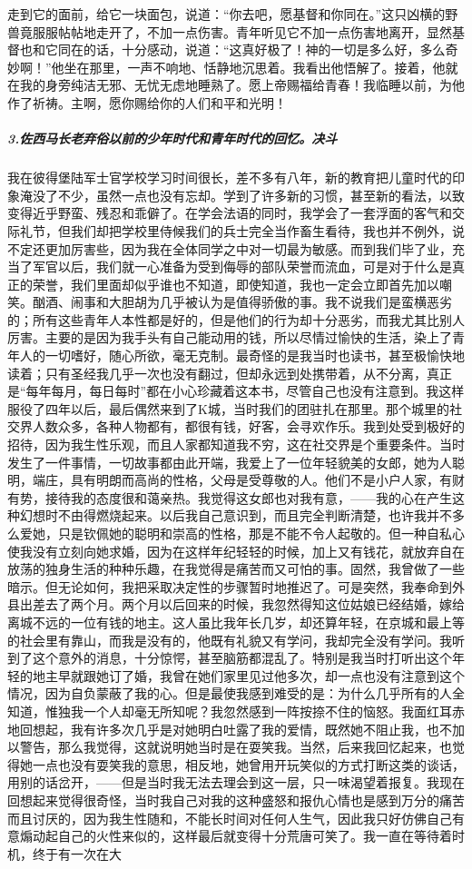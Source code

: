 走到它的面前，给它一块面包，说道：“你去吧，愿基督和你同在。”这只凶横的野兽竟服服帖帖地走开了，不加一点伤害。青年听见它不加一点伤害地离开，显然基督也和它同在的话，十分感动，说道：“这真好极了！神的一切是多么好，多么奇妙啊！”他坐在那里，一声不响地、恬静地沉思着。我看出他悟解了。接着，他就在我的身旁纯洁无邪、无忧无虑地睡熟了。愿上帝赐福给青春！我临睡以前，为他作了祈祷。主啊，愿你赐给你的人们和平和光明！
\subparagraph*{3.佐西马长老弃俗以前的少年时代和青年时代的回忆。决斗}
\par 我在彼得堡陆军士官学校学习时间很长，差不多有八年，新的教育把儿童时代的印象淹没了不少，虽然一点也没有忘却。学到了许多新的习惯，甚至新的看法，以致变得近乎野蛮、残忍和乖僻了。在学会法语的同时，我学会了一套浮面的客气和交际礼节，但我们却把学校里侍候我们的兵士完全当作畜生看待，我也并不例外，说不定还更加厉害些，因为我在全体同学之中对一切最为敏感。而到我们毕了业，充当了军官以后，我们就一心准备为受到侮辱的部队荣誉而流血，可是对于什么是真正的荣誉，我们里面却似乎谁也不知道，即使知道，我也一定会立即首先加以嘲笑。酗酒、闹事和大胆胡为几乎被认为是值得骄傲的事。我不说我们是蛮横恶劣的；所有这些青年人本性都是好的，但是他们的行为却十分恶劣，而我尤其比别人厉害。主要的是因为我手头有自己能动用的钱，所以尽情过愉快的生活，染上了青年人的一切嗜好，随心所欲，毫无克制。最奇怪的是我当时也读书，甚至极愉快地读着；只有圣经我几乎一次也没有翻过，但却永远到处携带着，从不分离，真正是“每年每月，每日每时”都在小心珍藏着这本书，尽管自己也没有注意到。我这样服役了四年以后，最后偶然来到了K城，当时我们的团驻扎在那里。那个城里的社交界人数众多，各种人物都有，都很有钱，好客，会寻欢作乐。我到处受到极好的招待，因为我生性乐观，而且人家都知道我不穷，这在社交界是个重要条件。当时发生了一件事情，一切故事都由此开端，我爱上了一位年轻貌美的女郎，她为人聪明，端庄，具有明朗而高尚的性格，父母是受尊敬的人。他们不是小户人家，有财有势，接待我的态度很和蔼亲热。我觉得这女郎也对我有意，——我的心在产生这种幻想时不由得燃烧起来。以后我自己意识到，而且完全判断清楚，也许我并不多么爱她，只是钦佩她的聪明和崇高的性格，那是不能不令人起敬的。但一种自私心使我没有立刻向她求婚，因为在这样年纪轻轻的时候，加上又有钱花，就放弃自在放荡的独身生活的种种乐趣，在我觉得是痛苦而又可怕的事。固然，我曾做了一些暗示。但无论如何，我把采取决定性的步骤暂时地推迟了。可是突然，我奉命到外县出差去了两个月。两个月以后回来的时候，我忽然得知这位姑娘已经结婚，嫁给离城不远的一位有钱的地主。这人虽比我年长几岁，却还算年轻，在京城和最上等的社会里有靠山，而我是没有的，他既有礼貌又有学问，我却完全没有学问。我听到了这个意外的消息，十分惊愕，甚至脑筋都混乱了。特别是我当时打听出这个年轻的地主早就跟她订了婚，我曾在她们家里见过他多次，却一点也没有注意到这个情况，因为自负蒙蔽了我的心。但是最使我感到难受的是：为什么几乎所有的人全知道，惟独我一个人却毫无所知呢？我忽然感到一阵按捺不住的恼怒。我面红耳赤地回想起，我有许多次几乎是对她明白吐露了我的爱情，既然她不阻止我，也不加以警告，那么我觉得，这就说明她当时是在耍笑我。当然，后来我回忆起来，也觉得她一点也没有耍笑我的意思，相反地，她曾用开玩笑似的方式打断这类的谈话，用别的话岔开，——但是当时我无法去理会到这一层，只一味渴望着报复。我现在回想起来觉得很奇怪，当时我自己对我的这种盛怒和报仇心情也是感到万分的痛苦而且讨厌的，因为我生性随和，不能长时间对任何人生气，因此我只好仿佛自己有意煽动起自己的火性来似的，这样最后就变得十分荒唐可笑了。我一直在等待着时机，终于有一次在大